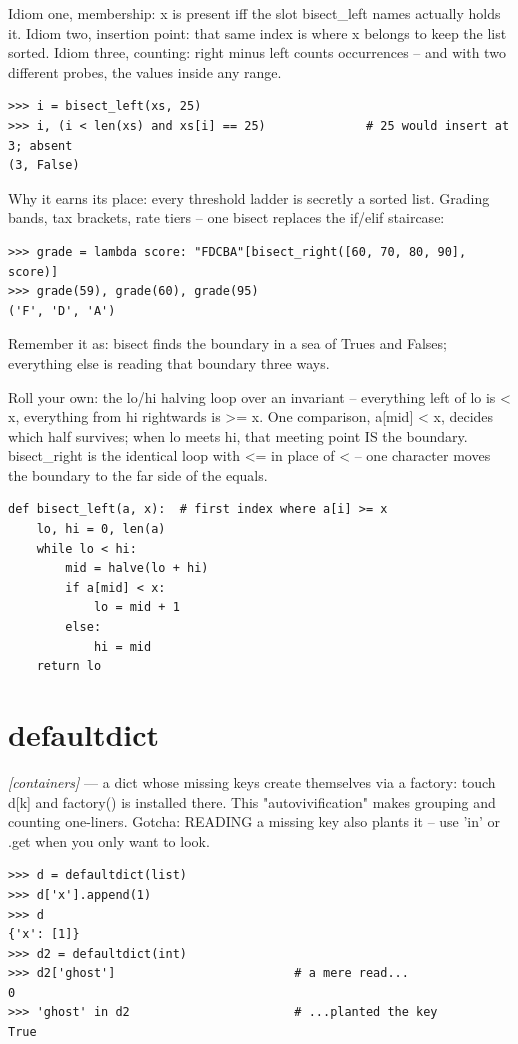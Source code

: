 \documentclass[11pt,letterpaper]{book}
\begin{document}
Idiom one, membership: x is present iff the slot bisect\_left names actually holds it. Idiom two, insertion point: that same index is where x belongs to keep the list sorted. Idiom three, counting: right minus left counts occurrences -- and with two different probes, the values inside any range.

\begin{lstlisting}[style=spec]
>>> i = bisect_left(xs, 25)
>>> i, (i < len(xs) and xs[i] == 25)              # 25 would insert at 3; absent
(3, False)
\end{lstlisting}

Why it earns its place: every threshold ladder is secretly a sorted list. Grading bands, tax brackets, rate tiers -- one bisect replaces the if/elif staircase:

\begin{lstlisting}[style=spec]
>>> grade = lambda score: "FDCBA"[bisect_right([60, 70, 80, 90], score)]
>>> grade(59), grade(60), grade(95)
('F', 'D', 'A')
\end{lstlisting}

Remember it as: bisect finds the boundary in a sea of Trues and Falses; everything else is reading that boundary three ways.


Roll your own: the lo/hi halving loop over an invariant -- everything left of lo is < x, everything from hi rightwards is >= x. One comparison, a[mid] < x, decides which half survives; when lo meets hi, that meeting point IS the boundary. bisect\_right is the identical loop with <= in place of < -- one character moves the boundary to the far side of the equals.

\begin{lstlisting}[style=code]
def bisect_left(a, x):  # first index where a[i] >= x
    lo, hi = 0, len(a)
    while lo < hi:
        mid = halve(lo + hi)
        if a[mid] < x:
            lo = mid + 1
        else:
            hi = mid
    return lo
\end{lstlisting}

\section{defaultdict}
\noindent\textit{[containers]} --- a dict whose missing keys create themselves via a factory: touch d[k] and factory() is installed there. This "autovivification" makes grouping and counting one-liners. Gotcha: READING a missing key also plants it -- use 'in' or .get when you only want to look.
\begin{lstlisting}[style=spec]
>>> d = defaultdict(list)
>>> d['x'].append(1)
>>> d
{'x': [1]}
>>> d2 = defaultdict(int)
>>> d2['ghost']                         # a mere read...
0
>>> 'ghost' in d2                       # ...planted the key
True
\end{lstlisting}
\end{document}

